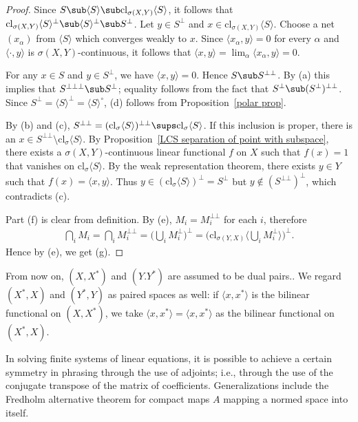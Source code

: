 \begin{proof}
Since $S\sub\langle S\rangle\sub\mathrm{cl}_{\sigma(X,Y)}\langle S\rangle$, it follows that $\mathrm{cl}_{\sigma(X,Y)}\langle S\rangle^\bot\sub\langle S\rangle^\bot\sub S^\bot$. Let $y\in S^\bot$ and $x\in\mathrm{cl}_{\sigma(X,Y)}\langle S\rangle$. Choose a net $(x_\alpha)$ from $\langle S\rangle$ which converges weakly to $x$. Since $\langle x_\alpha,y\rangle=0$ for every $\alpha$ and $\langle\cdot,y\rangle$ is $\sigma(X,Y)$-continuous, it follows that $\langle x,y\rangle=\lim_\alpha\langle x_\alpha,y\rangle=0$.\par
For any $x\in S$ and $y\in S^\bot$, we have $\langle x,y\rangle=0$. Hence $S\sub S^{\bot\bot}$. By (a) this implies that $S^{\bot\bot\bot}\sub S^{\bot}$; equality follows from the fact that $S^\bot\sub(S^\bot)^{\bot\bot}$. Since $S^\bot=\langle S\rangle^\bot=\langle S\rangle^\circ$, (d) follows from Proposition~\ref{polar prop}.\par
By (b) and (c), $S^{\bot\bot}=(\mathrm{cl}_\sigma\langle S\rangle)^{\bot\bot}\sups\mathrm{cl}_\sigma\langle S\rangle$. If this inclusion is proper, there is an $x\in S^{\bot\bot}\setminus\mathrm{cl}_\sigma\langle S\rangle$. By Proposition~\ref{LCS separation of point with subspace}, there exists a $\sigma(X,Y)$-continuous linear functional $f$ on $X$ such that $f(x)=1$ that vanishes on $\mathrm{cl}_\sigma\langle S\rangle$. By the weak representation theorem, there exists $y\in Y$ such that $f(x)=\langle x,y\rangle$. Thus $y\in(\mathrm{cl}_\sigma\langle S\rangle)^\bot=S^\bot$ but $y\notin(S^{\bot\bot})^{\bot}$, which contradicts (c).\par
Part (f) is clear from definition. By (e), $M_i=M_i^{\bot\bot}$ for each $i$, therefore
\begin{align*}
\bigcap_iM_i=\bigcap_iM_i^{\bot\bot}=\Big(\bigcup_iM_i^\bot\Big)^{\bot}=\Big(\mathrm{cl}_{\sigma(Y,X)}\Big\langle\bigcup_iM_i^\bot\Big\rangle\Big)^\bot.
\end{align*}
Hence by (e), we get (g).
\end{proof}
From now on, $(X,X^*)$ and $(Y.Y^*)$ are assumed to be dual pairs.. We regard $(X^*,X)$ and $(Y^*,Y)$ as paired spaces as well: if $\langle x,x^*\rangle$ is the bilinear functional on $(X,X^*)$, we take $\langle x,x^*\rangle=\langle x,x^*\rangle$ as the bilinear functional on $(X^*,X)$.\par
In solving finite systems of linear equations, it is possible to achieve a certain symmetry in phrasing through the use of adjoints; i.e., through the
use of the conjugate transpose of the matrix of coefficients. Generalizations include the Fredholm alternative theorem for compact maps $A$ mapping a normed space into itself.\par
